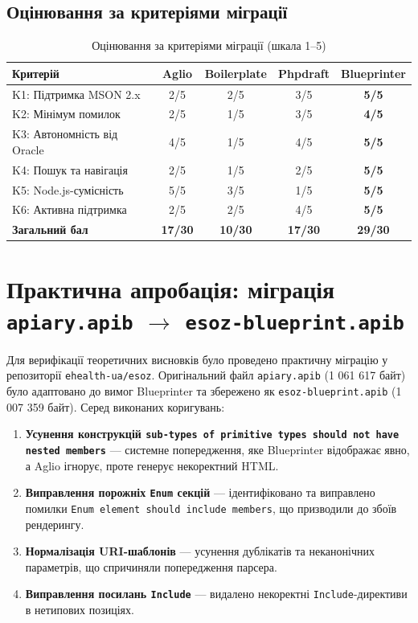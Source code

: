 \documentclass{article}
\begin{document}
\subsection{Оцінювання за критеріями міграції}
\begin{table}[htbp]
\centering
\caption{Оцінювання за критеріями міграції (шкала 1--5)}
\footnotesize
\setlength{\tabcolsep}{6pt}
\begin{tabular}{@{} p{5.5cm} c c c c @{}}
\toprule
\textbf{Критерій} & \textbf{Aglio} & \textbf{Boilerplate} & \textbf{Phpdraft} & \textbf{Blueprinter} \\
\midrule
K1: Підтримка MSON 2.x & 2/5 & 2/5 & 3/5 & \textbf{5/5} \\
K2: Мінімум помилок & 2/5 & 1/5 & 3/5 & \textbf{4/5} \\
K3: Автономність від Oracle & 4/5 & 1/5 & 4/5 & \textbf{5/5} \\
K4: Пошук та навігація & 2/5 & 1/5 & 2/5 & \textbf{5/5} \\
K5: Node.js-сумісність & 5/5 & 3/5 & 1/5 & \textbf{5/5} \\
K6: Активна підтримка & 2/5 & 2/5 & 4/5 & \textbf{5/5} \\
\midrule
\textbf{Загальний бал} & \textbf{17/30} & \textbf{10/30} & \textbf{17/30} & \textbf{29/30} \\
\bottomrule
\end{tabular}
\end{table}

\section{Практична апробація: міграція \texttt{apiary.apib} $\rightarrow$ \texttt{esoz-blueprint.apib}}
Для верифікації теоретичних висновків було проведено практичну міграцію у репозиторії \texttt{ehealth-ua/esoz}. Оригінальний файл \texttt{apiary.apib} (1 061 617 байт) було адаптовано до вимог Blueprinter та збережено як \texttt{esoz-blueprint.apib} (1 007 359 байт). Серед виконаних коригувань:
\begin{enumerate}
\item \textbf{Усунення конструкцій \texttt{sub-types of primitive types should not have nested members}} — системне попередження, яке Blueprinter відображає явно, а Aglio ігнорує, проте генерує некоректний HTML.
\item \textbf{Виправлення порожніх \texttt{Enum} секцій} — ідентифіковано та виправлено помилки \texttt{Enum element should include members}, що призводили до збоїв рендерингу.
\item \textbf{Нормалізація URI-шаблонів} — усунення дублікатів та неканонічних параметрів, що спричиняли попередження парсера.
\item \textbf{Виправлення посилань \texttt{Include}} — видалено некоректні \texttt{Include}-директиви в нетипових позиціях.
\end{enumerate}
\end{document}
